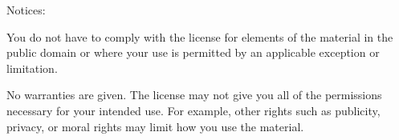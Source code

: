 Notices:

You do not have to comply with the license for elements of the material
in the public domain or where your use is permitted by an applicable
exception or limitation.

No warranties are given. The license may not give you all of the
permissions necessary for your intended use. For example, other rights
such as publicity, privacy, or moral rights may limit how you use the
material. 


